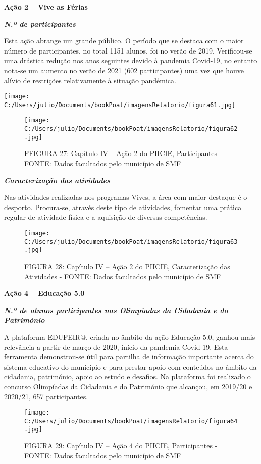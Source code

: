 \documentclass[
]{book}
\begin{document}
\textbf{Ação 2 -- Vive as Férias}

\textbf{\emph{N.º de participantes}}

Esta ação abrange um grande público. O período que se destaca com o maior número de participantes, no total 1151 alunos, foi no verão de 2019. Verificou-se uma drástica redução nos anos seguintes devido à pandemia Covid-19, no entanto nota-se um aumento no verão de 2021 (602 participantes) uma vez que houve alívio de restrições relativamente à situação pandémica.

\texttt{[image: C:/Users/julio/Documents/bookPoat/imagensRelatorio/figura61.jpg]}

\begin{figure}
\centering
\texttt{[image: C:/Users/julio/Documents/bookPoat/imagensRelatorio/figura62.jpg]}
\caption{FFIGURA 27: Capítulo IV -- Ação 2 do PIICIE, Participantes - FONTE: Dados facultados pelo município de SMF}
\end{figure}

\textbf{\emph{Caracterização das atividades}}

Nas atividades realizadas nos programas Vives, a área com maior destaque é o desporto. Procura-se, através deste tipo de atividades, fomentar uma prática regular de atividade física e a aquisição de diversas competências.

\begin{figure}
\centering
\texttt{[image: C:/Users/julio/Documents/bookPoat/imagensRelatorio/figura63.jpg]}
\caption{FIGURA 28: Capítulo IV -- Ação 2 do PIICIE, Caracterização das Atividades - FONTE: Dados facultados pelo município de SMF}
\end{figure}

\textbf{Ação 4 -- Educação 5.0}

\textbf{\emph{N.º de alunos participantes nas Olimpíadas da Cidadania e do Património}}

A plataforma EDUFEIR@, criada no âmbito da ação Educação 5.0, ganhou mais relevância a partir de março de 2020, início da pandemia Covid-19. Esta ferramenta demonstrou-se útil para partilha de informação importante acerca do sistema educativo do município e para prestar apoio com conteúdos no âmbito da cidadania, património, apoio ao estudo e desafios. Na plataforma foi realizado o concurso Olimpíadas da Cidadania e do Património que alcançou, em 2019/20 e 2020/21, 657 participantes.

\begin{figure}
\centering
\texttt{[image: C:/Users/julio/Documents/bookPoat/imagensRelatorio/figura64.jpg]}
\caption{FIGURA 29: Capítulo IV -- Ação 4 do PIICIE, Participantes - FONTE: Dados facultados pelo município de SMF}
\end{figure}
\end{document}
